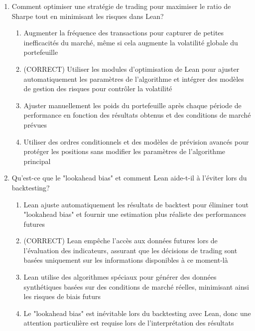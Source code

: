 \documentclass[a4paper,12pt]{article}
\begin{document}
\begin{enumerate}
    \item Comment optimiser une stratégie de trading pour maximiser le ratio de Sharpe tout en minimisant les risques dans Lean?
    \begin{enumerate}[label=(\Alph*)]
        \item Augmenter la fréquence des transactions pour capturer de petites inefficacités du marché, même si cela augmente la volatilité globale du portefeuille
        \item (CORRECT) Utiliser les modules d'optimisation de Lean pour ajuster automatiquement les paramètres de l'algorithme et intégrer des modèles de gestion des risques pour contrôler la volatilité
        \item Ajuster manuellement les poids du portefeuille après chaque période de performance en fonction des résultats obtenus et des conditions de marché prévues
        \item Utiliser des ordres conditionnels et des modèles de prévision avancés pour protéger les positions sans modifier les paramètres de l'algorithme principal
    \end{enumerate}

    \item Qu'est-ce que le "lookahead bias" et comment Lean aide-t-il à l'éviter lors du backtesting?
    \begin{enumerate}[label=(\Alph*)]
        \item Lean ajuste automatiquement les résultats de backtest pour éliminer tout "lookahead bias" et fournir une estimation plus réaliste des performances futures
        \item (CORRECT) Lean empêche l'accès aux données futures lors de l'évaluation des indicateurs, assurant que les décisions de trading sont basées uniquement sur les informations disponibles à ce moment-là
        \item Lean utilise des algorithmes spéciaux pour générer des données synthétiques basées sur des conditions de marché réelles, minimisant ainsi les risques de biais futurs
        \item Le "lookahead bias" est inévitable lors du backtesting avec Lean, donc une attention particulière est requise lors de l'interprétation des résultats
    \end{enumerate}


\end{enumerate}
\end{document}

